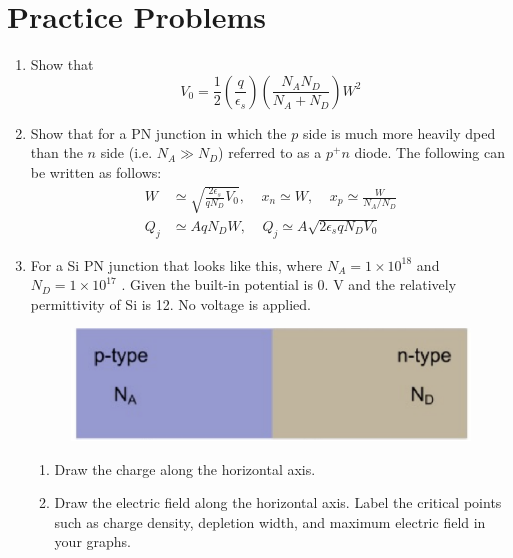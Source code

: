 \section{Practice Problems}
\begin{enumerate}
    \item Show that 
        \[V_0 = \frac12 (\frac{q}{\epsilon_s})(\frac{N_A N_D}{N_A + N_D}) W^2\]
    \item Show that for a PN junction in which the $p$ side is much more heavily dped than the $n$ side (i.e. $N_A \gg N_D$) referred to as a $p^+ n$ diode. The following can be written as follows:
        \begin{align*}
            W &\simeq \sqrt{\frac{2 \epsilon_s}{q N_D}V_0}, ~~~~~ x_n \simeq W, ~~~~~ x_p \simeq \frac{W}{N_A / N_D} \\
            Q_j &\simeq A q N_D W, ~~~~~ Q_j \simeq A \sqrt{2 \epsilon_s q N_D V_0}
        \end{align*}
    
    \item For a Si PN junction that looks like this, where $N_A = 1 \times 10^{18}$ \conc and $N_D = 1 \times 10^{17}$ \conc. Given the built-in potential is 0. V and the relatively permittivity of Si is 12. No voltage is applied.
    \begin{figure}[H]
        \centering
        \includegraphics[scale=0.5]{figs/ch03/ans2.png}
    \end{figure}
    \begin{enumerate}
        \item Draw the charge along the horizontal axis.
        \item Draw the electric field along the horizontal axis. Label the critical points such as charge density, depletion width, and maximum electric field in your graphs.
    \end{enumerate}


\end{enumerate}
